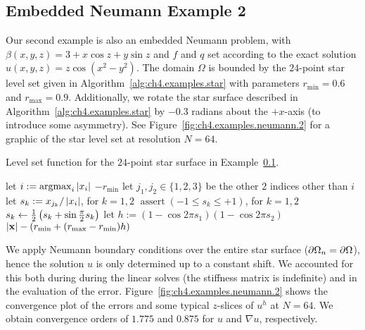 \subsection{Embedded Neumann Example 2} \label{subsec:ch4.examples.neumann.2}

Our second example is also an embedded Neumann problem, with $\beta(x,y,z) = 3 + x \cos z + y \sin z$ and $f$ and $q$ set according to the exact solution $u(x,y,z) = z \cos \left( x^2 - y^2 \right)$. The domain $\Omega$ is bounded by the $24$-point star level set given in Algorithm~\ref{alg:ch4.examples.star} with parameters $r_{\text{min}} = 0.6$ and $r_{\text{max}} = 0.9$. Additionally, we rotate the star surface described in Algorithm~\ref{alg:ch4.examples.star} by $-0.3$ radians about the $+x$-axis (to introduce some asymmetry). See Figure~\ref{fig:ch4.examples.neumann.2} for a graphic of the star level set at resolution $N = 64$.

\begin{algorithm}
\caption{Level set function for the $24$-point star surface in Example~\ref{subsec:ch4.examples.neumann.2}.}
\label{alg:ch4.examples.star}
\begin{algorithmic}
\STATE {}
\STATE {}
\STATE let $i := \operatorname{argmax}_i \left\lvert x_i \right\rvert$
    \RETURN $-r_{\text{min}}$
\ENDIF
\STATE let $j_1, j_2 \in \{1, 2, 3\}$ be the other $2$ indices other than $i$
\STATE let $s_k := x_{j_k} / \left\lvert x_i \right\rvert$, for $k = 1,2$
\STATE {}
\STATE $\operatorname{assert}(-1 \leq s_k \leq +1)$, for $k = 1,2$
\STATE $s_k \leftarrow \frac{1}{2} \left( s_k + \sin \frac{\pi}{2} s_k \right)$ 
\STATE let $h := (1 - \cos 2 \pi s_1) (1 - \cos 2\pi s_2)$
\RETURN $\left\lvert \mathbf{x} \right\rvert - (r_{\text{min}} + (r_{\text{max}} - r_{\text{min}}) h)$
\end{algorithmic}
\end{algorithm}

We apply Neumann boundary conditions over the entire star surface ($\partial\Omega_n = \partial\Omega$), hence the solution $u$ is only determined up to a constant shift. We accounted for this both during during the linear solves (the stiffness matrix is indefinite) and in the evaluation of the error. Figure~\ref{fig:ch4.examples.neumann.2} shows the convergence plot of the errors and some typical $z$-slices of $u^h$ at $N = 64$. We obtain convergence orders of $1.775$ and $0.875$ for $u$ and $\nabla u$, respectively.

